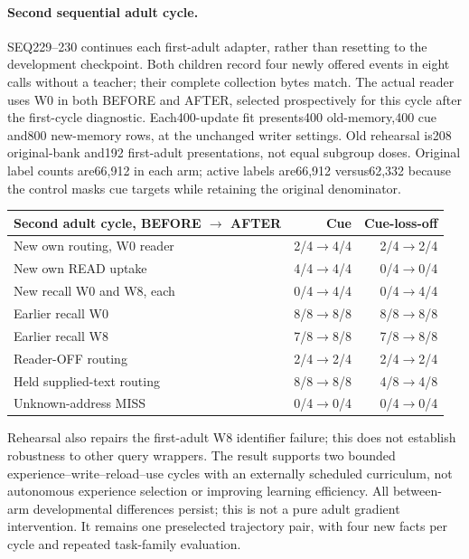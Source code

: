 \documentclass{article}
\begin{document}
\paragraph{Second sequential adult cycle.}
SEQ229--230 continues each first-adult adapter, rather than resetting to the
development checkpoint. Both children record four newly offered events in
eight calls without a teacher; their complete collection bytes match. The
actual reader uses W0 in both BEFORE and AFTER, selected prospectively for
this cycle after the first-cycle diagnostic. Each400-update fit presents400
old-memory,400 cue and800 new-memory rows, at the unchanged writer settings.
Old rehearsal is208 original-bank and192 first-adult presentations, not equal
subgroup doses. Original label counts are66,912 in each arm; active labels
are66,912 versus62,332 because the control masks cue targets while retaining
the original denominator.
\begin{center}
\begin{tabular}{lrr}
\toprule
Second adult cycle, BEFORE $\to$ AFTER & Cue & Cue-loss-off \\
\midrule
New own routing, W0 reader &2/4$\to$4/4&2/4$\to$2/4\\
New own READ uptake &4/4$\to$4/4&0/4$\to$0/4\\
New recall W0 and W8, each &0/4$\to$4/4&0/4$\to$4/4\\
Earlier recall W0 &8/8$\to$8/8&8/8$\to$8/8\\
Earlier recall W8 &7/8$\to$8/8&7/8$\to$8/8\\
Reader-OFF routing &2/4$\to$2/4&2/4$\to$2/4\\
Held supplied-text routing &8/8$\to$8/8&4/8$\to$4/8\\
Unknown-address MISS &0/4$\to$0/4&0/4$\to$0/4\\
\bottomrule
\end{tabular}
\end{center}
Rehearsal also repairs the first-adult W8 identifier failure; this does not
establish robustness to other query wrappers. The result supports two bounded
experience--write--reload--use cycles with an externally scheduled curriculum,
not autonomous experience selection or improving learning efficiency. All
between-arm developmental differences persist; this is not a pure adult
gradient intervention. It remains one preselected trajectory pair, with four
new facts per cycle and repeated task-family evaluation.
\end{document}
